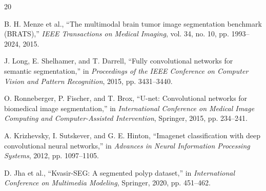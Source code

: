 \documentclass[a4paper, journal]{IEEEtran}
\begin{document}
\begin{thebibliography}{20}

    B. H. Menze et al., ``The multimodal brain tumor image segmentation benchmark (BRATS),'' \emph{IEEE Transactions on Medical Imaging}, vol. 34, no. 10, pp. 1993--2024, 2015.

    J. Long, E. Shelhamer, and T. Darrell, ``Fully convolutional networks for semantic segmentation,'' in \emph{Proceedings of the IEEE Conference on Computer Vision and Pattern Recognition}, 2015, pp. 3431--3440.

    O. Ronneberger, P. Fischer, and T. Brox, ``U-net: Convolutional networks for biomedical image segmentation,'' in \emph{International Conference on Medical Image Computing and Computer-Assisted Intervention}, Springer, 2015, pp. 234--241.

    A. Krizhevsky, I. Sutskever, and G. E. Hinton, ``Imagenet classification with deep convolutional neural networks,'' in \emph{Advances in Neural Information Processing Systems}, 2012, pp. 1097--1105.

    D. Jha et al., ``Kvasir-SEG: A segmented polyp dataset,'' in \emph{International Conference on Multimedia Modeling}, Springer, 2020, pp. 451--462.

\end{thebibliography}
\end{document}

